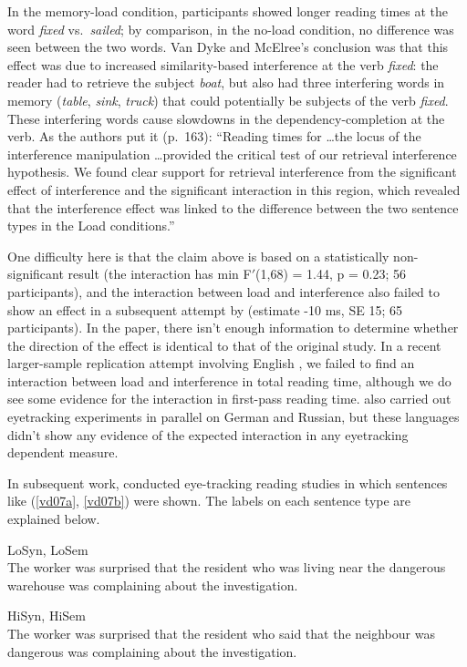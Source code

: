 \documentclass{cambridge7A}\usepackage[]{graphicx}\usepackage[]{color}
\begin{document}
In the memory-load condition, participants showed longer reading times at the word \textit{fixed} vs.\ \textit{sailed}; by comparison, in the no-load condition, no difference was seen between the two words. Van Dyke and McElree's conclusion was that this effect was due to increased  similarity-based interference at the verb \textit{fixed}: the reader had to retrieve the subject \textit{boat}, but also had three interfering words in memory (\textit{table}, \textit{sink}, \textit{truck}) that could potentially be subjects of the verb \textit{fixed}. These interfering words cause slowdowns in the dependency-completion at the verb. As the authors put it (p.\ 163): ``Reading times for \dots the locus of the interference manipulation \dots provided the critical test of our retrieval interference hypothesis. We found clear support for retrieval interference from the significant effect of interference and the significant interaction in this region, which revealed that the interference effect was linked to the difference between the two sentence types in the Load conditions.''

One difficulty here is that the claim above is based on a statistically non-significant result (the interaction has min F$'$(1,68) = 1.44, p = 0.23; 56 participants), 
and the interaction between load and interference also failed to show an effect in a subsequent attempt by \cite{van2014low} (estimate -10 ms, SE 15; 65 participants). 
In the \cite{van2014low} paper, there isn't enough information to determine whether the direction of the effect is identical to that of the original study. In a recent larger-sample replication attempt involving English \citep{MertzenEtAlAMLaP2019}, we failed to find an interaction between load and interference in total reading time, although we do see some evidence for the interaction in first-pass reading time. \cite{MertzenEtAlAMLaP2019} also carried out eyetracking experiments in parallel on  German and Russian, but these languages didn't show any evidence of the expected interaction in any eyetracking dependent measure. 

 In subsequent work, \cite{VanDyke2007} conducted eye-tracking reading studies in which sentences like (\ref{vd07a},   \ref{vd07b}) were shown. The labels on each sentence type are explained below.

\begin{exe}
\ex \label{vd07a}
\begin{xlist}
\item LoSyn, LoSem\\
The worker was surprised that the resident who was living near the dangerous warehouse was complaining about the investigation.
\item HiSyn, HiSem\\
The worker was surprised that the resident who said that the neighbour was dangerous was complaining about the investigation.
\end{xlist}
\end{exe}
\end{document}
